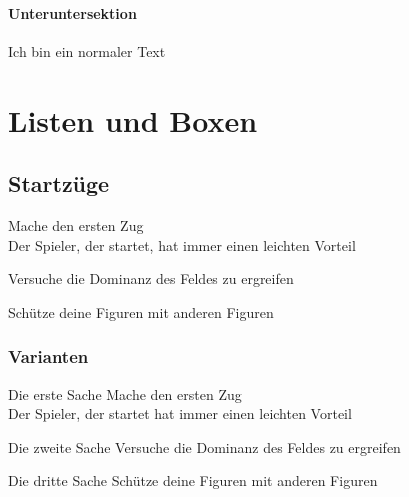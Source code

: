 \documentclass[cv]{HTWself}
\begin{document}
{	\subsubsection{Unteruntersektion}
	Ich bin ein normaler Text
	\newpage
	
	\chapter{Listen und Boxen}
	\section{Startzüge}
	\blindtext
	\begin{HTWBulletList}
	\item
	Mache den ersten Zug\\Der Spieler, der startet, hat immer einen leichten Vorteil
	\item
	Versuche die Dominanz des Feldes zu ergreifen
	\item
	Schütze deine Figuren mit anderen Figuren
	\end{HTWBulletList}
	\blindtext	
	
	\newpage
	\subsection{Varianten}
	\blindtext
	
	\begin{HTWdefList}
	\item[Die erste Sache]
	Mache den ersten Zug\\Der Spieler, der startet hat immer einen leichten Vorteil
	\item[Die zweite Sache]
	Versuche die Dominanz des Feldes zu ergreifen
	\item[Die dritte Sache]
	Schütze deine Figuren mit anderen Figuren
	\end{HTWdefList}
	
	\begin{wrapfigure}{r}{0.5\textwidth}%
	\end{wrapfigure}
	\blindtext
	\\\par
	\blindtext
	\newpage
	\blindtext
	\blindtext
	\newpage
	
}
\end{document}
